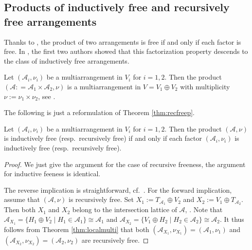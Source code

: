 \subsection{Products of inductively free and 
recursively free arrangements}
\label{ssec:recfreeproducts}

Thanks to \cite[Prop.\ 4.28]{orlikterao:arrangements},
the product of two arrangements is free if and only if 
each factor is free. 
In \cite[Prop.\ 2.10]{hogeroehrle:indfree}, 
the first two authors showed that this factorization property
descends to the class of inductively free arrangements.

Let $({{\mathcal A}}_i, \nu_i)$ be a multiarrangement in $V_i$ for $i = 1,2$.
Then the product $({{\mathcal A}} : = {{\mathcal A}}_1 \times {{\mathcal A}}_2, \nu)$ is a multiarrangement
in $V = V_1 \oplus V_2$ with multiplicity $\nu := \nu_1 \times \nu_2$,
see \cite{abeteraowakefield:euler}. 

The following is just a reformulation of Theorem \ref{thm:recfreep}.

\begin{theorem}
\label{thm:recfreeproductsmulti}
Let $({{\mathcal A}}_i, \nu_i)$ be a multiarrangement in $V_i$ for $i = 1,2$.
Then the product $({{\mathcal A}}, \nu)$ is inductively free 
(resp.\ recursively free) 
if and only if each 
factor $({{\mathcal A}}_i, \nu_i)$ is inductively free 
(resp.\ recursively free). 
\end{theorem}

\begin{proof}
We just give the argument for the case of recursive 
freeness, the argument for inductive feeness is identical.

The reverse implication is straightforward, 
cf.~\cite[Prop.\ 2.10]{hogeroehrle:indfree}.
For the forward implication, assume that 
$({{\mathcal A}}, \nu)$ is recursively free.
Set $X_1 := T_{{{\mathcal A}}_1} \oplus V_2$
and $X_2 := V_1 \oplus T_{{{\mathcal A}}_2}$. 
Then both $X_1$ and $X_2$ belong to 
the intersection lattice of ${{\mathcal A}}$, 
\cite[Prop.\ 2.14]{orlikterao:arrangements}.
Note that 
${{\mathcal A}}_{X_1} = \{H_1 \oplus V_2 \mid H_1 \in {{\mathcal A}}_1\} \cong {{\mathcal A}}_1$ and 
${{\mathcal A}}_{X_2} = \{V_1 \oplus H_2 \mid H_2 \in {{\mathcal A}}_2\} \cong {{\mathcal A}}_2$.
It thus follows from Theorem \ref{thm:localmulti} 
that both
$({{\mathcal A}}_{X_1}, \nu_{X_1}) = ({{\mathcal A}}_1, \nu_1)$ and 
$({{\mathcal A}}_{X_2}, \nu_{X_2}) = ({{\mathcal A}}_2, \nu_2)$ 
are recursively free.
\end{proof}

